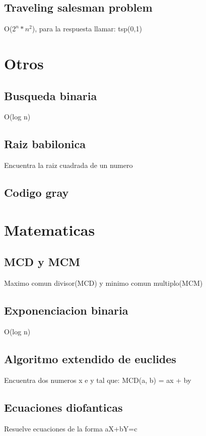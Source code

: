 \documentclass[10pt,landscape,twocolumn,a4paper,notitlepage]{article}
\newcommand\cppfile[2][]{

}
\begin{document}
			\subsection{Traveling salesman problem}
			O($2^{n}*n^{2}$), para la respuesta llamar: tsp(0,1)
			\cppfile[7-22]{programacion_dinamica/traveling_salesman_problem.cpp}
		
		\section{Otros}
			\subsection{Busqueda binaria}
			O(log n)
			\cppfile[7-19]{otros/busqueda_binaria.cpp}
			\subsection{Raiz babilonica}
			Encuentra la raiz cuadrada de un numero
			\cppfile[4-12]{otros/raiz_babilonica.cpp}
			\subsection{Codigo gray}
			\cppfile[5-12]{otros/codigo_gray.cpp}
			
		\section{Matematicas}
			\subsection{MCD y MCM}
			Maximo comun divisor(MCD) y minimo comun multiplo(MCM)
			\cppfile[5-6]{matematicas/MCD_y_MCM.cpp}
			\subsection{Exponenciacion binaria}
			O(log n)
			\cppfile[6-13]{matematicas/exponenciacion_binaria.cpp}
			\subsection{Algoritmo extendido de euclides}
			Encuentra dos numeros x e y tal que: MCD(a, b) = ax + by
			\cppfile[5-15]{matematicas/algoritmo_extendido_de_euclides.cpp}
			\subsection{Ecuaciones diofanticas}
			Resuelve ecuaciones de la forma aX+bY=c
			\cppfile[20-38]{matematicas/ecuaciones_diofanticas.cpp}
\end{document}
